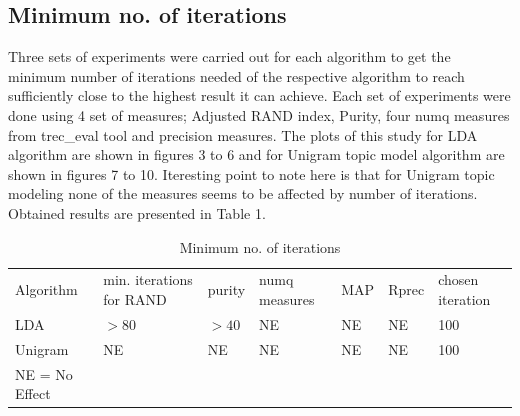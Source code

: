 \subsection{Minimum no. of iterations} Three sets of experiments were carried out for each algorithm to get the minimum number of iterations needed of the respective algorithm to reach sufficiently close to the highest result it can achieve. Each set of experiments were done using 4 set of measures; Adjusted RAND index, Purity, four numq measures from trec\_eval tool and precision measures. The plots of this study for LDA algorithm are shown in figures 3 to 6 and for Unigram topic model algorithm are shown in figures 7 to 10. Iteresting point to note here is that for Unigram topic modeling none of the measures seems to be affected by number of iterations. Obtained results are presented in Table 1.
\begin{table}
\caption{Minimum no. of iterations}
\label{tab:iter}       %
\begin{tabular}{lllllll}
\hline\noalign{\smallskip}
Algorithm & min. iterations for RAND & purity & numq measures & MAP & Rprec & chosen iteration  \\
\noalign{\smallskip}\hline\noalign{\smallskip}
LDA & $ >80$ & $ >40$ & NE & NE & NE & 100 \\
Unigram & NE & NE & NE & NE & NE & 100 \\
\noalign{\smallskip}\hline
NE = No Effect
\end{tabular}
\end{table}

